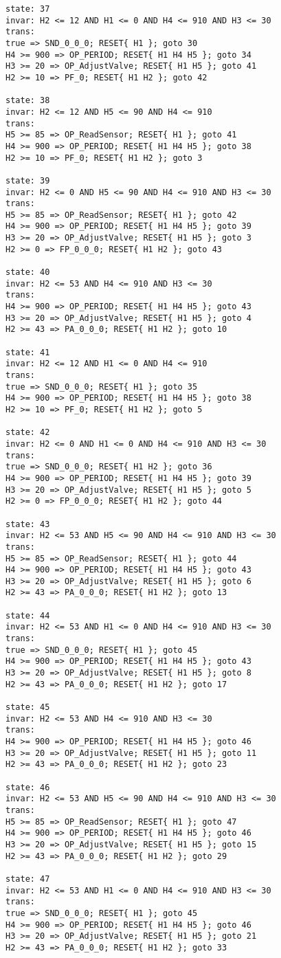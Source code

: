 {\begin{verbatim}
state: 37
invar: H2 <= 12 AND H1 <= 0 AND H4 <= 910 AND H3 <= 30
trans: 
true => SND_0_0_0; RESET{ H1 }; goto 30
H4 >= 900 => OP_PERIOD; RESET{ H1 H4 H5 }; goto 34
H3 >= 20 => OP_AdjustValve; RESET{ H1 H5 }; goto 41
H2 >= 10 => PF_0; RESET{ H1 H2 }; goto 42

state: 38
invar: H2 <= 12 AND H5 <= 90 AND H4 <= 910
trans: 
H5 >= 85 => OP_ReadSensor; RESET{ H1 }; goto 41
H4 >= 900 => OP_PERIOD; RESET{ H1 H4 H5 }; goto 38
H2 >= 10 => PF_0; RESET{ H1 H2 }; goto 3

state: 39
invar: H2 <= 0 AND H5 <= 90 AND H4 <= 910 AND H3 <= 30
trans: 
H5 >= 85 => OP_ReadSensor; RESET{ H1 }; goto 42
H4 >= 900 => OP_PERIOD; RESET{ H1 H4 H5 }; goto 39
H3 >= 20 => OP_AdjustValve; RESET{ H1 H5 }; goto 3
H2 >= 0 => FP_0_0_0; RESET{ H1 H2 }; goto 43

state: 40
invar: H2 <= 53 AND H4 <= 910 AND H3 <= 30
trans: 
H4 >= 900 => OP_PERIOD; RESET{ H1 H4 H5 }; goto 43
H3 >= 20 => OP_AdjustValve; RESET{ H1 H5 }; goto 4
H2 >= 43 => PA_0_0_0; RESET{ H1 H2 }; goto 10

state: 41
invar: H2 <= 12 AND H1 <= 0 AND H4 <= 910
trans: 
true => SND_0_0_0; RESET{ H1 }; goto 35
H4 >= 900 => OP_PERIOD; RESET{ H1 H4 H5 }; goto 38
H2 >= 10 => PF_0; RESET{ H1 H2 }; goto 5

state: 42
invar: H2 <= 0 AND H1 <= 0 AND H4 <= 910 AND H3 <= 30
trans: 
true => SND_0_0_0; RESET{ H1 H2 }; goto 36
H4 >= 900 => OP_PERIOD; RESET{ H1 H4 H5 }; goto 39
H3 >= 20 => OP_AdjustValve; RESET{ H1 H5 }; goto 5
H2 >= 0 => FP_0_0_0; RESET{ H1 H2 }; goto 44

state: 43
invar: H2 <= 53 AND H5 <= 90 AND H4 <= 910 AND H3 <= 30
trans: 
H5 >= 85 => OP_ReadSensor; RESET{ H1 }; goto 44
H4 >= 900 => OP_PERIOD; RESET{ H1 H4 H5 }; goto 43
H3 >= 20 => OP_AdjustValve; RESET{ H1 H5 }; goto 6
H2 >= 43 => PA_0_0_0; RESET{ H1 H2 }; goto 13

state: 44
invar: H2 <= 53 AND H1 <= 0 AND H4 <= 910 AND H3 <= 30
trans: 
true => SND_0_0_0; RESET{ H1 }; goto 45
H4 >= 900 => OP_PERIOD; RESET{ H1 H4 H5 }; goto 43
H3 >= 20 => OP_AdjustValve; RESET{ H1 H5 }; goto 8
H2 >= 43 => PA_0_0_0; RESET{ H1 H2 }; goto 17

state: 45
invar: H2 <= 53 AND H4 <= 910 AND H3 <= 30
trans: 
H4 >= 900 => OP_PERIOD; RESET{ H1 H4 H5 }; goto 46
H3 >= 20 => OP_AdjustValve; RESET{ H1 H5 }; goto 11
H2 >= 43 => PA_0_0_0; RESET{ H1 H2 }; goto 23

state: 46
invar: H2 <= 53 AND H5 <= 90 AND H4 <= 910 AND H3 <= 30
trans: 
H5 >= 85 => OP_ReadSensor; RESET{ H1 }; goto 47
H4 >= 900 => OP_PERIOD; RESET{ H1 H4 H5 }; goto 46
H3 >= 20 => OP_AdjustValve; RESET{ H1 H5 }; goto 15
H2 >= 43 => PA_0_0_0; RESET{ H1 H2 }; goto 29

state: 47
invar: H2 <= 53 AND H1 <= 0 AND H4 <= 910 AND H3 <= 30
trans: 
true => SND_0_0_0; RESET{ H1 }; goto 45
H4 >= 900 => OP_PERIOD; RESET{ H1 H4 H5 }; goto 46
H3 >= 20 => OP_AdjustValve; RESET{ H1 H5 }; goto 21
H2 >= 43 => PA_0_0_0; RESET{ H1 H2 }; goto 33
\end{verbatim}
}
\onecolumn

